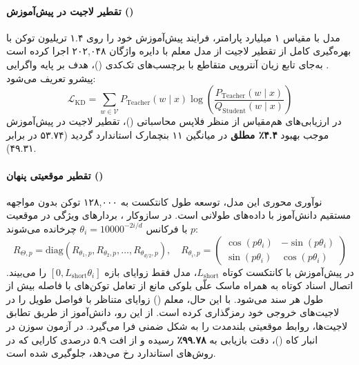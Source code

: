 \item {}

\paragraph*{تقطیر لاجیت در پیش‌آموزش ()}
مدل  با مقیاس ۱ میلیارد پارامتر، فرایند پیش‌آموزش خود را روی ۱.۴ تریلیون توکن با بهره‌گیری کامل از تقطیر لاجیت از مدل معلم  با دایره واژگان ۲۰۲,۰۴۸ اجرا کرده است \cite{mobilellmpro2025}. به‌جای تابع زیان آنتروپی متقاطع با برچسب‌های تک‌کدی ()، هدف بر پایه واگرایی پیشرو  تعریف می‌شود:
\begin{equation}
    \mathcal{L}_{\mathrm{KD}} = \sum_{w \in \mathcal{V}} P_{\mathrm{Teacher}}(w \mid x) \log \left( \frac{P_{\mathrm{Teacher}}(w \mid x)}{Q_{\mathrm{Student}}(w \mid x)} \right)
\end{equation}
در ارزیابی‌های هم‌مقیاس از منظر فلاپس محاسباتی ()، تقطیر لاجیت در پیش‌آموزش موجب بهبود \textbf{۴.۴٪ مطلق} در میانگین ۱۱ بنچمارک استاندارد گردید (۵۳.۷۴ در برابر ۴۹.۳۱).

\paragraph*{تقطیر موقعیتی پنهان ()}
نوآوری محوری این مدل، توسعه طول کانتکست به ۱۲۸,۰۰۰ توکن بدون مواجهه مستقیم دانش‌آموز با داده‌های طولانی است. در سازوکار ، بردارهای ویژگی در موقعیت $p$ با فرکانس $\theta_i = 10000^{-2i/d}$ چرخانده می‌شوند:
\begin{equation}
    R_{\Theta, p} = \mathrm{diag}\left( R_{\theta_1, p}, R_{\theta_2, p}, \dots, R_{\theta_{d/2}, p} \right), \quad 
    R_{\theta_i, p} = \begin{pmatrix} \cos(p\theta_i) & -\sin(p\theta_i) \\ \sin(p\theta_i) & \cos(p\theta_i) \end{pmatrix}
\end{equation}
در پیش‌آموزش با کانتکست کوتاه $L_{\mathrm{short}}$، مدل فقط زوایای بازه $[0, L_{\mathrm{short}}\theta_i]$ را می‌بیند. اتصال اسناد کوتاه به همراه ماسک علّی بلوکی مانع از تعامل توکن‌های با فاصله بیش از طول هر سند می‌شود. با این حال، معلم () زوایای متناظر با فواصل طویل را در لاجیت‌های خروجی خود رمزگذاری کرده است. از این رو، دانش‌آموز از طریق تطابق لاجیت‌ها، روابط موقعیتی بلندمدت را به شکل ضمنی فرا می‌گیرد. در آزمون سوزن در انبار کاه ()، دقت بازیابی به \textbf{۹۹.۷۸٪} رسیده و از افت ۵.۹ درصدی کارایی که در روش‌های استاندارد رخ می‌دهد، جلوگیری شده است.

